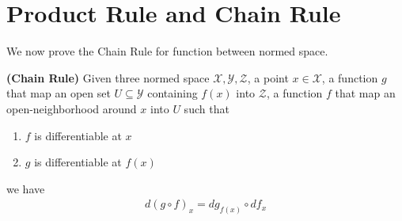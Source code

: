 \documentclass{report}
\begin{document}
\section{Product Rule and Chain Rule}
\begin{mdframed}
We now prove the Chain Rule for function between normed space. 
\end{mdframed}
\begin{theorem}
\label{CR}
\textbf{(Chain Rule)} Given three normed space $\mathcal{X},\mathcal{Y},\mathcal{Z}$, a point $x \in \mathcal{X}$, a function $g$ that map an open set $U\subseteq \mathcal{Y}$ containing $f(x)$ into $\mathcal{Z}$, a function $f$ that map an open-neighborhood around $x$ into $U$ such that 
\begin{enumerate}[label=(\alph*)]
  \item $f$ is differentiable at $x$
   \item $g$ is differentiable at $f(x)$
\end{enumerate}
we have 
\begin{align*}
d(g\circ f)_x=dg_{f(x)}\circ df_{x}
\end{align*}
\end{theorem}
\end{document}
